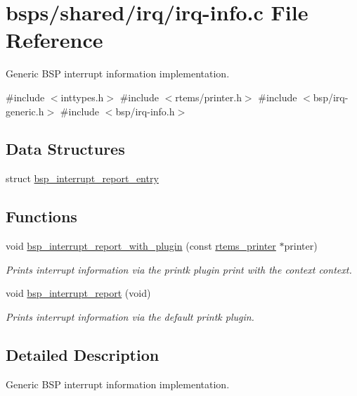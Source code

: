 \hypertarget{irq-info_8c}{}\section{bsps/shared/irq/irq-\/info.c File Reference}
\label{irq-info_8c}


Generic B\+SP interrupt information implementation.  


{\ttfamily \#include $<$inttypes.\+h$>$}\newline
{\ttfamily \#include $<$rtems/printer.\+h$>$}\newline
{\ttfamily \#include $<$bsp/irq-\/generic.\+h$>$}\newline
{\ttfamily \#include $<$bsp/irq-\/info.\+h$>$}\newline
\subsection*{Data Structures}
\begin{DoxyCompactItemize}
\item 
struct \mbox{\hyperlink{structbsp__interrupt__report__entry}{bsp\+\_\+interrupt\+\_\+report\+\_\+entry}}
\end{DoxyCompactItemize}
\subsection*{Functions}
\begin{DoxyCompactItemize}
\item 
\mbox{\label{irq-info_8c_a168f97599eb189fe05bd02878c26109b}} 
void \mbox{\hyperlink{irq-info_8c_a168f97599eb189fe05bd02878c26109b}{bsp\+\_\+interrupt\+\_\+report\+\_\+with\+\_\+plugin}} (const \mbox{\hyperlink{structrtems__printer}{rtems\+\_\+printer}} $\ast$printer)
\begin{DoxyCompactList}\small\item\em Prints interrupt information via the printk plugin {\itshape print} with the context {\itshape context}. \end{DoxyCompactList}\item 
\mbox{\label{irq-info_8c_aedadad85f99e06e3101e9da39b343985}} 
void \mbox{\hyperlink{irq-info_8c_aedadad85f99e06e3101e9da39b343985}{bsp\+\_\+interrupt\+\_\+report}} (void)
\begin{DoxyCompactList}\small\item\em Prints interrupt information via the default printk plugin. \end{DoxyCompactList}\end{DoxyCompactItemize}


\subsection{Detailed Description}
Generic B\+SP interrupt information implementation. 

